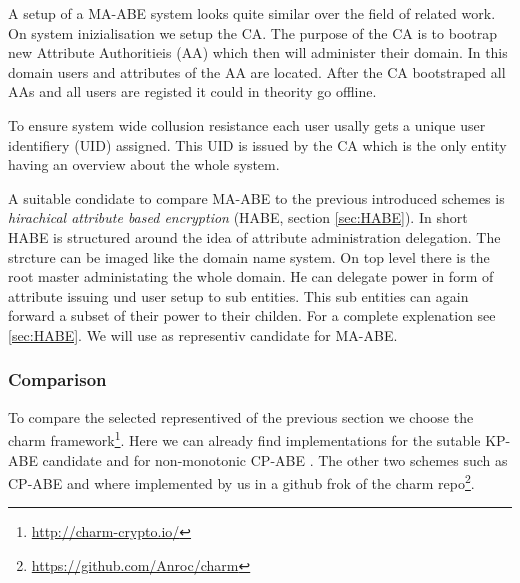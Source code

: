 A setup of a \ac{MA-ABE} system looks quite similar over the field of related work. On system inizialisation we setup the \ac{CA}. The purpose of the \ac{CA} is to bootrap new Attribute Authoritieis (\ac{AA}) which then will administer their domain. In this domain users and attributes of the \ac{AA} are located. After the \ac{CA} bootstraped all \ac{AA}s and all users are registed it could in theority go offline. 

To ensure system wide collusion resistance each user usally gets a unique user identifiery (\ac{UID}) assigned. This \ac{UID} is issued by the \ac{CA} which is the only entity having an overview about the whole system. 

A suitable condidate to compare \ac{MA-ABE} to the previous introduced schemes is \textit{hirachical attribute based encryption} (\ac{HABE}, section \ref{sec:HABE}). In short \ac{HABE} is structured around the idea of attribute administration delegation. The strcture can be imaged like the domain name system. On top level there is the root master administating the whole domain. He can delegate power in form of attribute issuing und user setup to sub entities. This sub entities can again forward a subset of their power to their childen. For a complete explenation see \ref{sec:HABE}. We will use \cite{Wang:2010:HAE:1866307.1866414} as representiv candidate for \ac{MA-ABE}. 

\subsubsection{Comparison}
To compare the selected representived of the previous section we choose the charm framework\footnote{\url{http://charm-crypto.io/}}. Here we can already find implementations for the sutable \ac{KP-ABE} candidate \cite{lewko2010revocation} and for non-monotonic \ac{CP-ABE} \cite{10.1007/978-3-642-54631-0_16}. The other two schemes such as \ac{CP-ABE} \cite{liu2016practical} and \cite{wang2011hierarchical} where implemented by us in a github frok of the charm repo\footnote{\url{https://github.com/Anroc/charm}}. 

